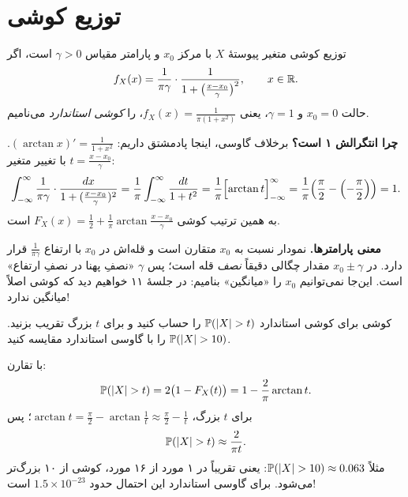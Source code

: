 \section{توزیع کوشی}
\label{sec:cauchy}

\begin{definition}[label=def:cauchy]{توزیع کوشی}
متغیر پیوستهٔ $X$  با مرکز $x_0$ و پارامتر مقیاس $\gamma>0$ است، اگر
\[ f_X(x)=\frac{1}{\pi\gamma}\cdot\frac{1}{1+\bigl(\frac{x-x_0}{\gamma}\bigr)^2},\qquad x\in\mathbb{R}. \]
حالت $x_0=0$ و $\gamma=1$، یعنی $f_X(x)=\frac{1}{\pi(1+x^2)}$، را \emph{کوشی استاندارد} می‌نامیم.
\end{definition}

\textbf{چرا انتگرالش ۱ است؟} برخلاف گاوسی، اینجا پادمشتق داریم: $(\arctan x)'=\frac1{1+x^2}$. با تغییر متغیر $t=\frac{x-x_0}{\gamma}$:
\[ \int_{-\infty}^{\infty}\frac{1}{\pi\gamma}\cdot\frac{dx}{1+(\frac{x-x_0}{\gamma})^2}=\frac1\pi\int_{-\infty}^{\infty}\frac{dt}{1+t^2}=\frac1\pi\Bigl[\arctan t\Bigr]_{-\infty}^{\infty}=\frac1\pi\Bigl(\frac\pi2-\Bigl(-\frac\pi2\Bigr)\Bigr)=1. \]
به همین ترتیب  کوشی $F_X(x)=\frac12+\frac1\pi\arctan\frac{x-x_0}{\gamma}$ است.

\begin{note}
\textbf{معنی پارامترها.} نمودار نسبت به $x_0$ متقارن است و قله‌اش در $x_0$ با ارتفاع $\frac{1}{\pi\gamma}$ قرار دارد. در $x_0\pm\gamma$ مقدار چگالی دقیقاً \emph{نصف} قله است؛ پس $\gamma$ «نصفِ پهنا در نصفِ ارتفاع» است. این‌جا نمی‌توانیم $x_0$ را «میانگین» بنامیم: در جلسهٔ ۱۱ خواهیم دید که کوشی اصلاً میانگین ندارد!
\end{note}



\begin{example}[label=ex:cauchy-tail]{ کوشی}
برای کوشی استاندارد $\P(|X|>t)$ را حساب کنید و برای $t$ بزرگ تقریب بزنید. $\P(|X|>10)$ را با گاوسی استاندارد مقایسه کنید.
\begin{solution}
با تقارن:
\[ \P(|X|>t)=2\bigl(1-F_X(t)\bigr)=1-\frac2\pi\arctan t. \]
برای $t$ بزرگ، $\arctan t=\frac\pi2-\arctan\frac1t\approx\frac\pi2-\frac1t$؛ پس
\[ \P(|X|>t)\approx\frac{2}{\pi t}. \]
مثلاً $\P(|X|>10)\approx0.063$: یعنی تقریباً در ۱ مورد از ۱۶ مورد، کوشی از ۱۰ بزرگ‌تر می‌شود. برای گاوسی استاندارد این احتمال حدود $1.5\times10^{-23}$ است!
\end{solution}
\end{example}

